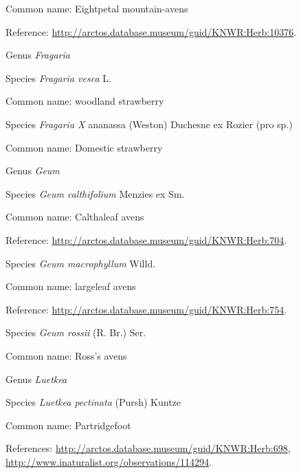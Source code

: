 \documentclass[9pt, article]{memoir}
\begin{document}
\begin{multicols}{2}
Common name: Eightpetal mountain-avens

Reference: 
\url{http://arctos.database.museum/guid/KNWR:Herb:10376}.

\vspace{6pt}\noindent\hspace{30pt}Genus \textit{Fragaria}


\vspace{6pt}\noindent\hspace{36pt}Species \textit{Fragaria vesca} L.


Common name: woodland strawberry

\vspace{6pt}\noindent\hspace{36pt}Species \textit{Fragaria X} ananassa (Weston) Duchesne ex Rozier (pro sp.)


Common name: Domestic strawberry

\vspace{6pt}\noindent\hspace{30pt}Genus \textit{Geum}


\vspace{6pt}\noindent\hspace{36pt}Species \textit{Geum calthifolium} Menzies ex Sm.


Common name: Calthaleaf avens

Reference: 
\url{http://arctos.database.museum/guid/KNWR:Herb:704}.

\vspace{6pt}\noindent\hspace{36pt}Species \textit{Geum macrophyllum} Willd.


Common name: largeleaf avens

Reference: 
\url{http://arctos.database.museum/guid/KNWR:Herb:754}.

\vspace{6pt}\noindent\hspace{36pt}Species \textit{Geum rossii} (R. Br.) Ser.


Common name: Ross's avens

\vspace{6pt}\noindent\hspace{30pt}Genus \textit{Luetkea}


\vspace{6pt}\noindent\hspace{36pt}Species \textit{Luetkea pectinata} (Pursh) Kuntze


Common name: Partridgefoot

References: 
\url{http://arctos.database.museum/guid/KNWR:Herb:698}, 
\url{http://www.inaturalist.org/observations/114294}.


\end{multicols}
\end{document}
